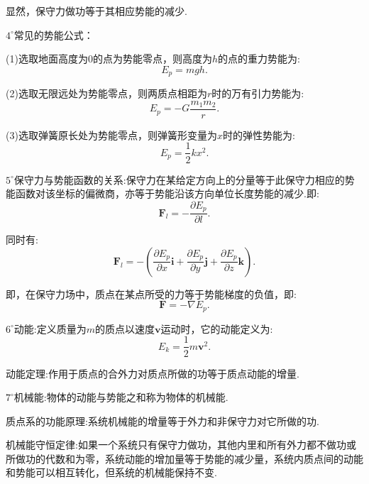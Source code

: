 \documentclass[UTF8]{ctexart}
\begin{document}
	显然，保守力做功等于其相应势能的减少.

	$4^{\circ}$常见的势能公式：

	(1)选取地面高度为0的点为势能零点，则高度为$h$的点的重力势能为:
	\begin{equation*}
		E_p=mgh.
	\end{equation*}

	(2)选取无限远处为势能零点，则两质点相距为$r$时的万有引力势能为:
	\begin{equation*}
		E_p=-G\frac{m_1m_2}{r}.
	\end{equation*}

	(3)选取弹簧原长处为势能零点，则弹簧形变量为$x$时的弹性势能为:
	\begin{equation*}
		E_p=\frac{1}{2}kx^2.
	\end{equation*}

	$5^{\circ}$保守力与势能函数的关系:保守力在某给定方向上的分量等于此保守力相应的势能函数对该坐标的偏微商，亦等于势能沿该方向单位长度势能的减少.即:
	\begin{equation*}
		{\boldsymbol F}_l=-\frac{\partial E_p}{\partial l}.
	\end{equation*}

	同时有:
	\begin{equation*}
		{\boldsymbol F}_l=-(\frac{\partial E_p}{\partial x}{\boldsymbol i}+\frac{\partial E_p}{\partial y}{\boldsymbol j}+\frac{\partial E_p}{\partial z}{\boldsymbol k}).
	\end{equation*}

	即，在保守力场中，质点在某点所受的力等于势能梯度的负值，即:
	\begin{equation*}
		{\boldsymbol F}=-\nabla E_p.
	\end{equation*}

	$6^{\circ}$动能:定义质量为$m$的质点以速度${\boldsymbol v}$运动时，它的动能定义为:
	\begin{equation*}
		E_k=\frac{1}{2}m{\boldsymbol v}^2.
	\end{equation*}

	动能定理:作用于质点的合外力对质点所做的功等于质点动能的增量.

	$7^{\circ}$机械能:物体的动能与势能之和称为物体的机械能.

	质点系的功能原理:系统机械能的增量等于外力和非保守力对它所做的功.

	机械能守恒定律:如果一个系统只有保守力做功，其他内里和所有外力都不做功或所做功的代数和为零，系统动能的增加量等于势能的减少量，系统内质点间的动能和势能可以相互转化，但系统的机械能保持不变.
\end{document}
